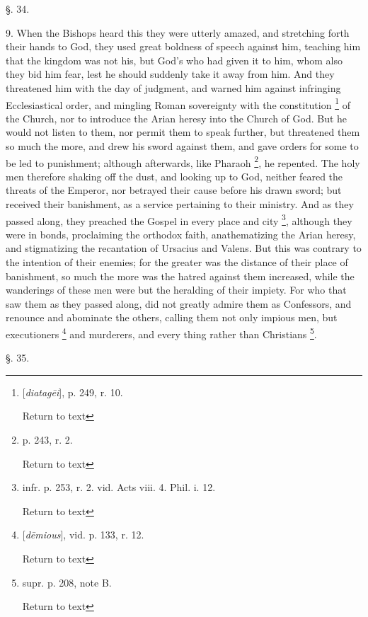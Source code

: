 §. 34.

9. When the Bishops heard this they were utterly
amazed, and stretching forth their hands to God, they used great
boldness of speech against him, teaching him that the kingdom was not
his, but God’s who had given it to him, whom also they bid him fear,
lest he should suddenly take it away from him. And they threatened him
with the day of judgment, and warned him against infringing
Ecclesiastical order, and mingling Roman sovereignty with the
constitution \footnote{[\emph{diatag\={e}i}], p. 249, r. 10.

Return to text} of the
Church, nor to introduce the Arian heresy into the Church of God. But
he would not listen to them, nor permit them to speak further, but
threatened them so much the more, and drew his sword against them, and
gave orders for some to be led to punishment; although afterwards,
like Pharaoh \footnote{p. 243, r. 2.

Return to text}, he
repented. The holy men therefore shaking off the dust, and
looking up to God, neither feared the threats of the Emperor, nor
betrayed their cause before his drawn sword; but received their
banishment, as a service pertaining to their ministry. And as they
passed along, they preached the Gospel in every place and city \footnote{infr. p. 253, r. 2. vid. Acts viii. 4. Phil. i. 12.

Return to text}, although they were in bonds, proclaiming the orthodox faith,
anathematizing the Arian heresy, and stigmatizing the recantation of
Ursacius and Valens. But this was contrary to the intention of their
enemies; for the greater was the distance of their place of
banishment, so much the more was the hatred against them increased,
while the wanderings of these men were but the heralding of their
impiety. For who that saw them as they passed along, did not greatly
admire them as Confessors, and renounce and abominate the others,
calling them not only impious men, but executioners \footnote{[\emph{d\={e}mious}], vid. p. 133, r. 12.

Return to text} and murderers, and every thing rather than Christians \footnote{supr. p. 208, note B.

Return to text}.


§. 35.

